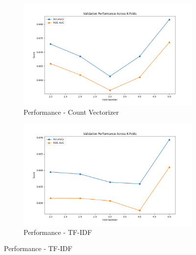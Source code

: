\begin{figure}[H]
    \centering
    \begin{subfigure}[b]{0.48\textwidth}
        \includegraphics[width=\textwidth]{img/report_info/img/1.4.RF/best_random_forest_count.png}
        \caption{Performance - Count Vectorizer}
        \label{fig:rf-count}
    \end{subfigure}
    \begin{subfigure}[b]{0.48\textwidth}
        \includegraphics[width=\textwidth]{img/report_info/img/1.4.RF/best_random_forest_tfidf.png}
        \caption{Performance - TF-IDF}
        \label{fig:rf-tfidf}
    \end{subfigure}
    

\end{figure}
